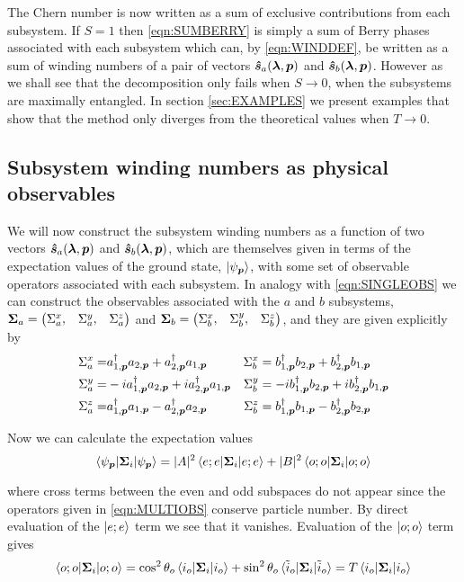 The Chern number is now written as a sum of exclusive contributions from each subsystem. If $S=1$ then \eqref{eqn:SUMBERRY} is simply a sum of Berry phases associated with each subsystem which can, by \eqref{eqn:WINDDEF}, be written as a sum of winding numbers of a pair of vectors $\boldsymbol{\hat{s}}_{a}(\boldsymbol{\lambda},\boldsymbol{p})$ and $\boldsymbol{\hat{s}}_{b}(\boldsymbol{\lambda},\boldsymbol{p})$. However as we shall see that the decomposition only fails when $S\rightarrow0$, when the subsystems are maximally entangled. In section \ref{sec:EXAMPLES} we present examples that show that the method only diverges from the theoretical values when $T\rightarrow 0$.

\subsection{Subsystem winding numbers as physical observables}

We will now construct the subsystem winding numbers as a function of two vectors $\boldsymbol{\hat{s}}_{a}(\boldsymbol{\lambda},\boldsymbol{p})$ and $\boldsymbol{\hat{s}}_{b}(\boldsymbol{\lambda},\boldsymbol{p})$, which are themselves given in terms of the expectation values of the ground state, $\ket{\psi_{\boldsymbol{p}}}$, with some set of observable operators associated with each subsystem. In analogy with \eqref{eqn:SINGLEOBS} we can construct the observables associated with the $a$ and $b$ subsystems, $\boldsymbol{\Sigma}_{a}=\begin{pmatrix} \Sigma_{a}^{x}, & \Sigma_{a}^{y}, & \Sigma_{a}^{z}\end{pmatrix} $ and $\boldsymbol{\Sigma}_{b}=\begin{pmatrix} \Sigma_{b}^{x}, & \Sigma_{b}^{y}, & \Sigma_{b}^{z}\end{pmatrix}$, and they are given explicitly by
\begin{align}\label{eqn:MULTIOBS}
    \Sigma^{x}_{a}=&a_{1,\boldsymbol{p}}^{\dagger}a_{2,\boldsymbol{p}}+a^{\dagger}_{2,\boldsymbol{p}}a_{1,\boldsymbol{p}} &\Sigma^{x}_{b}&=b_{1,\boldsymbol{p}}^{\dagger}b_{2,\boldsymbol{p}}+b^{\dagger}_{2,\boldsymbol{p}}b_{1,\boldsymbol{p}}\nonumber\\
    \Sigma^{y}_{a}=&-ia_{1,\boldsymbol{p}}^{\dagger}a_{2,\boldsymbol{p}}+ia^{\dagger}_{2,\boldsymbol{p}}a_{1,\boldsymbol{p}} &\Sigma^{y}_{b}&=-ib_{1,\boldsymbol{p}}^{\dagger}b_{2,\boldsymbol{p}}+ib^{\dagger}_{2,\boldsymbol{p}}b_{1,\boldsymbol{p}}\nonumber\\
    \Sigma^{z}_{a}=&a_{1,\boldsymbol{p}}^{\dagger}a_{1,\boldsymbol{p}}-a^{\dagger}_{2,\boldsymbol{p}}a_{2,\boldsymbol{p}} &\Sigma^{z}_{b}&=b_{1,\boldsymbol{p}}^{\dagger}b_{1,\boldsymbol{p}}-b^{\dagger}_{2,\boldsymbol{p}}b_{2,\boldsymbol{p}}
\end{align}

\noi Now we can calculate the expectation values
\begin{equation}
\braket{\psi_{\boldsymbol{p}}|\boldsymbol{\Sigma}_{i}|\psi_{\boldsymbol{p}}} = |A|^{2}\braket{e;e|\boldsymbol{\Sigma}_{i}|e;e}+ |B|^{2}\braket{o;o|\boldsymbol{\Sigma}_{i}|o;o}
\end{equation}

\noi where cross terms between the even and odd subspaces do not appear since the operators given in \eqref{eqn:MULTIOBS} conserve particle number. By direct evaluation of the $\ket{e;e}$ term we see that it vanishes. Evaluation of the $\ket{o;o}$ term gives
\begin{equation}
    \braket{o;o|\boldsymbol{\Sigma}_{i}|o;o}=\cos^{2}\theta_{o}\braket{i_{o}|\boldsymbol{\Sigma}_{i}|i_{o}} + \sin^{2}\theta_{o}\braket{\tilde{i}_{o}|\boldsymbol{\Sigma}_{i}|\tilde{i}_{o}}=T\braket{i_{o}|\boldsymbol{\Sigma}_{i}|i_{o}}
\end{equation}

